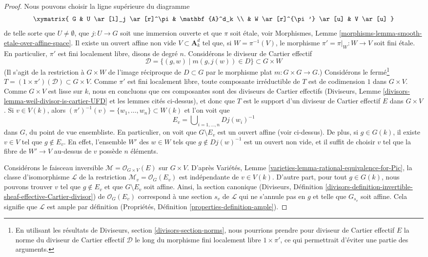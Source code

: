 \begin{proof}
\medskip\noindent
Nous pouvons choisir la ligne supérieure du diagramme
$$
\xymatrix{
G & U \ar[l]_j \ar[r]^\pi & \mathbf{A}^d_k \\
& W \ar[r]^{\pi'} \ar[u] & V \ar[u]
}
$$
de telle sorte que $U \not = \emptyset$, que $j : U \to G$ soit une immersion ouverte et que
$\pi$ soit \'etale, voir
Morphismes, Lemme \ref{morphisms-lemma-smooth-etale-over-affine-space}.
Il existe un ouvert affine non vide $V \subset \mathbf{A}^d_k$ tel que,
si $W = \pi^{-1}(V)$, le morphisme $\pi' = \pi|_W : W \to V$ soit fini \'etale.
En particulier, $\pi'$ est fini localement libre, disons de degré $n$.
Considérons le diviseur de Cartier effectif
$$
\mathcal{D} = \{(g, w) \mid m(g, j(w)) \in D\} \subset G \times W
$$
(Il s'agit de la restriction à $G \times W$ de l'image réciproque de $D \subset G$
par le morphisme plat $m : G \times G \to G$.)
Considérons le fermé\footnote{En utilisant les résultats
de Diviseurs, section \ref{divisors-section-norms},
nous pourrions prendre pour diviseur de Cartier effectif
$E$ la norme du diviseur de Cartier effectif $\mathcal{D}$
le long du morphisme fini localement libre $1 \times \pi'$, ce qui permettrait d'éviter
une partie des arguments.}
$T = (1 \times \pi')(\mathcal{D}) \subset G \times V$.
Comme $\pi'$ est fini localement libre, toute composante irréductible
de $T$ est de codimension $1$ dans $G \times V$. Comme $G \times V$
est lisse sur $k$, nous en concluons que ces composantes sont des diviseurs de Cartier
effectifs (Diviseurs, Lemme \ref{divisors-lemma-weil-divisor-is-cartier-UFD}
et les lemmes cités ci-dessus),
et donc que $T$ est le support d'un diviseur de Cartier effectif
$E$ dans $G \times V$. Si $v \in V(k)$, alors
$(\pi')^{-1}(v) = \{w_1, \ldots, w_n\} \subset W(k)$ et l'on voit que
$$
E_v = \bigcup\nolimits_{i = 1, \ldots, n} D j(w_i)^{-1}
$$
dans $G$, du point de vue ensembliste. En particulier, on voit que $G \setminus E_v$
est un ouvert affine (voir ci-dessus).
De plus, si $g \in G(k)$, il existe $v \in V$
tel que $g \not \in E_v$. En effet, l'ensemble $W'$ des $w \in W$ tels que
$g \not \in Dj(w)^{-1}$ est un ouvert non vide, et il suffit de choisir $v$
tel que la fibre de $W' \to V$ au-dessus de $v$ possède $n$ éléments.

\medskip\noindent
Considérons le faisceau inversible
$\mathcal{M} = \mathcal{O}_{G \times V}(E)$ sur $G \times V$.
D'après Variétés, Lemme \ref{varieties-lemma-rational-equivalence-for-Pic},
la classe d'isomorphisme $\mathcal{L}$ de la restriction
$\mathcal{M}_v = \mathcal{O}_G(E_v)$ est indépendante de $v \in V(k)$.
D'autre part, pour tout $g \in G(k)$, nous pouvons trouver $v$
tel que $g \not \in E_v$ et que $G \setminus E_v$
soit affine. Ainsi, la section canonique
(Diviseurs, Définition
\ref{divisors-definition-invertible-sheaf-effective-Cartier-divisor})
de $\mathcal{O}_G(E_v)$
correspond à une section $s_v$ de $\mathcal{L}$ qui ne
s'annule pas en $g$ et telle que $G_{s_v}$ soit affine.
Cela signifie que $\mathcal{L}$ est ample par définition
(Propriétés, Définition \ref{properties-definition-ample}).
\end{proof}

